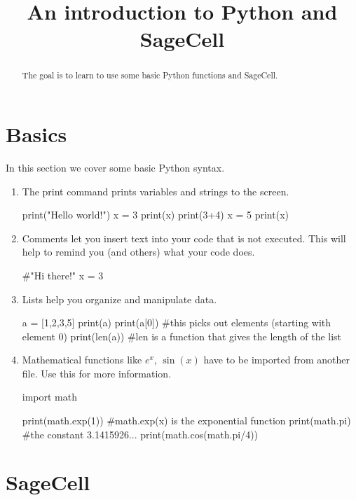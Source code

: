 \documentclass{ximera}
\title{An introduction to Python and SageCell}
\begin{document}
\begin{abstract}  
The goal is to learn to use some basic Python functions and SageCell.
\end{abstract}  
\maketitle

\section{Basics}

In this section we cover some basic Python syntax.

    \begin{enumerate}
        \item The print command prints variables and strings to the screen.
\begin{sageCell}
print("Hello world!")
x = 3
print(x)
print(3+4)
x = 5
print(x)
\end{sageCell}

	\item Comments let you insert text into your code that is not executed. This will help to remind you (and others) what your code does.
\begin{sageCell}
#"Hi there!"
x = 3
\end{sageCell}
	\item Lists help you organize and manipulate data.
\begin{sageCell}
a = [1,2,3,5]
print(a)
print(a[0])   #this picks out elements (starting with element 0)
print(len(a)) #len is a function that gives the length of the list
\end{sageCell}
		\item Mathematical functions like $e^x$, $\sin(x)$ have to be imported from another file. Use this  for more information.
\begin{sageCell}
import math

print(math.exp(1))   #math.exp(x) is the exponential function
print(math.pi)       #the constant 3.1415926...
print(math.cos(math.pi/4))
\end{sageCell}
    \end{enumerate}

\section{SageCell}
\end{document}
